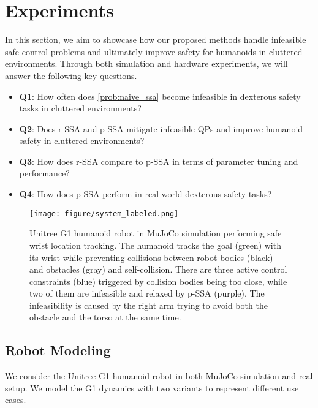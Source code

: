 



\section{Experiments}
\label{sec:experiment}

In this section, we aim to showcase how our proposed methods handle infeasible safe control problems and ultimately improve safety for humanoids in cluttered environments.
Through both simulation and hardware experiments, we will answer the following key questions.

\begin{itemize}
\item \textbf{Q1}: How often does \eqref{prob:naive_ssa} become infeasible in dexterous safety tasks in cluttered environments?
\item \textbf{Q2}: Does r-SSA and p-SSA mitigate infeasible QPs and improve humanoid safety in cluttered environments?
\item \textbf{Q3}: How does r-SSA compare to p-SSA in terms of parameter tuning and performance?
\item \textbf{Q4}: How does p-SSA perform in real-world dexterous safety tasks?
\end{itemize}



\begin{figure}[ht]
    \centering
    \texttt{[image: figure/system\_labeled.png]}
    \caption{Unitree G1 humanoid robot in MuJoCo simulation performing safe wrist location tracking.
    The humanoid tracks the goal (green) with its wrist while preventing collisions between robot bodies (black) and obstacles (gray) and self-collision.
    There are three active control constraints (blue) triggered by collision bodies being too close, while two of them are infeasible and relaxed by p-SSA (purple).
    The infeasibility is caused by the right arm trying to avoid both the obstacle and the torso at the same time.
    }
    \label{fig:system}
\end{figure}

\subsection{Robot Modeling}\label{sec:robot_model}

We consider the Unitree G1 humanoid robot in both MuJoCo simulation and real setup.
We model the G1 dynamics with two variants to represent different use cases.

